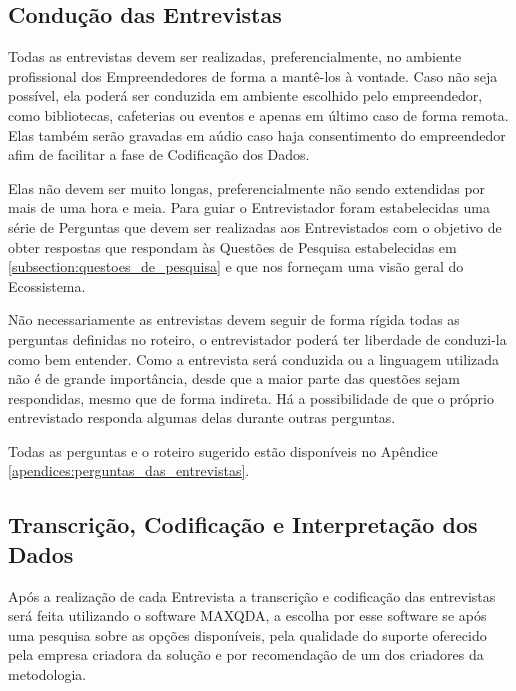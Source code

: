 \subsection{Condução das Entrevistas}
\label{subsection:conducao_das_entrevistas}

Todas as entrevistas devem ser realizadas, preferencialmente, no ambiente profissional dos Empreendedores de forma a mantê-los à vontade. Caso não seja possível, ela poderá ser conduzida em ambiente escolhido pelo empreendedor, como bibliotecas, cafeterias ou eventos e apenas em último caso de forma remota. Elas também serão gravadas em aúdio caso haja consentimento do empreendedor afim de facilitar a fase de Codificação dos Dados.

Elas não devem ser muito longas, preferencialmente não sendo extendidas por mais de uma hora e meia. Para guiar o Entrevistador foram estabelecidas uma série de Perguntas que devem ser realizadas aos Entrevistados com o objetivo de obter respostas que respondam às Questões de Pesquisa estabelecidas em \ref{subsection:questoes_de_pesquisa} e que nos forneçam uma visão geral do Ecossistema. 

Não necessariamente as entrevistas devem seguir de forma rígida todas as perguntas definidas no roteiro, o entrevistador poderá ter liberdade de conduzi-la como bem entender. Como a entrevista será conduzida ou a linguagem utilizada não é de grande importância, desde que a maior parte das questões sejam respondidas, mesmo que de forma indireta. Há a possibilidade de que o próprio entrevistado responda algumas delas durante outras perguntas. 

Todas as perguntas e o roteiro sugerido estão disponíveis no Apêndice \ref{apendices:perguntas_das_entrevistas}.

\subsection{Transcrição, Codificação e Interpretação dos Dados}
\label{subsection:codificacao_e_interpretacao_dos_dados}

Após a realização de cada Entrevista a transcrição e codificação das entrevistas será feita utilizando o software MAXQDA, a escolha por esse software se após uma pesquisa sobre as opções disponíveis, pela qualidade do suporte oferecido pela empresa criadora da solução e por recomendação de um dos criadores da metodologia.